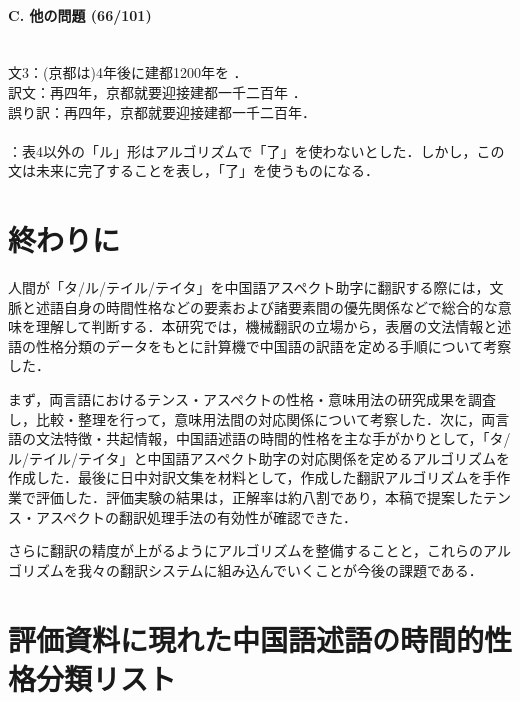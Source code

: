 \paragraph{C. 他の問題 (66/101)}　\\
文3：(京都は)4年後に建都1200年を ．\\
訳文：再四年，京都就要迎接建都一千二百年 ．\\
誤り訳：再四年，京都就要迎接建都一千二百年．\\
\\
：表4以外の「ル」形はアルゴリズムで「了」を使わないとした．しかし，この文は未来に完了することを表し，「了」を使うものになる．


\section{終わりに}
人間が「タ/ル/テイル/テイタ」を中国語アスペクト助字に翻訳する際には，文脈と述語自身の時間性格などの要素および諸要素間の優先関係などで総合的な意味を理解して判断する．本研究では，機械翻訳の立場から，表層の文法情報と述語の性格分類のデータをもとに計算機で中国語の訳語を定める手順について考察した．

まず，両言語におけるテンス・アスペクトの性格・意味用法の研究成果を調査し，比較・整理を行って，意味用法間の対応関係について考察した．次に，両言語の文法特徴・共起情報，中国語述語の時間的性格を主な手がかりとして，「タ/ル/テイル/テイタ」と中国語アスペクト助字の対応関係を定めるアルゴリズムを作成した．最後に日中対訳文集を材料として，作成した翻訳アルゴリズムを手作業で評価した．評価実験の結果は，正解率は約八割であり，本稿で提案したテンス・アスペクトの翻訳処理手法の有効性が確認できた．

さらに翻訳の精度が上がるようにアルゴリズムを整備することと，これらのアルゴリズムを我々の翻訳システム\cite{Imai2002,Imai2003}に組み込んでいくことが今後の課題である．





\appendix
\section*{評価資料に現れた中国語述語の時間的性格分類リスト}

